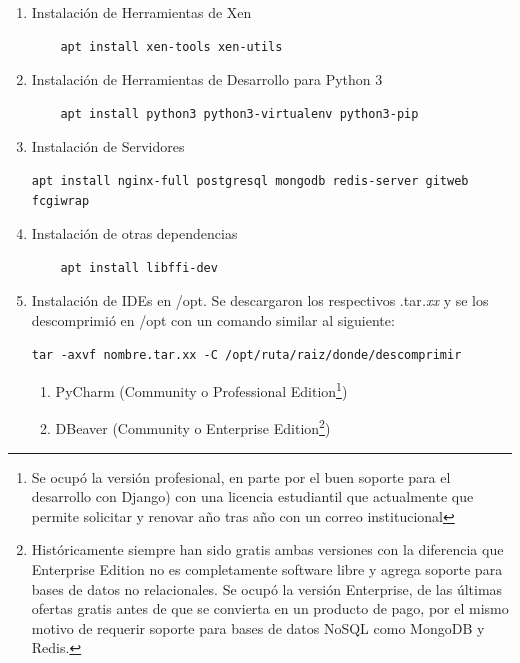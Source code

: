 \begin{enumerate}
\begin{lstlisting}[breaklines=true]
	auto xenbr0
	iface xenbr0 inet static
		address 10.10.10.1
		netmask 255.255.255.0
		bridge_ports wlan0

	#other possibly useful options in a
	#	virtualized environment
		#bridge_stp off		# disable
		#		Spanning Tree Protocol
		#bridge_waitport 0	# no delay
		#		before a port becomes
		#		available
		#bridge_fd 0		# no forwarding
		#		delay

	## configure a (separate) bridge for
	#	the DomUs without giving Dom0 an
	#	IP on it
	#auto xenbr1
	#iface xenbr1 inet manual
	#   bridge_ports eth1

	EOF

	reboot
		\end{lstlisting}
	\item Instalación de Herramientas de Xen
		\begin{lstlisting}
	apt install xen-tools xen-utils
		\end{lstlisting}
    \item Instalación de Herramientas de Desarrollo para Python 3
    	\begin{lstlisting}
	apt install python3 python3-virtualenv python3-pip
    	\end{lstlisting}
    \item Instalación de Servidores
    	\begin{lstlisting}[breaklines=true]
	apt install nginx-full postgresql mongodb redis-server gitweb fcgiwrap
    	\end{lstlisting}
    \item Instalación de otras dependencias
    	\begin{lstlisting}
	apt install libffi-dev
    	\end{lstlisting}
    \item Instalación de IDEs en /opt. Se descargaron los respectivos .tar\textit{.xx} y se los descomprimió en /opt con un comando similar al siguiente:
    	\begin{lstlisting}[breaklines=true]
	tar -axvf nombre.tar.xx -C /opt/ruta/raiz/donde/descomprimir
    	\end{lstlisting}
    \begin{enumerate}
    	\item PyCharm (Community o Professional Edition\footnote{Se ocupó la versión profesional, en parte por el buen soporte para el desarrollo con Django) con una licencia estudiantil que actualmente que permite solicitar y renovar año tras año con un correo institucional})
        \item DBeaver (Community o Enterprise Edition\footnote{Históricamente siempre han sido gratis ambas versiones con la diferencia que Enterprise Edition no es completamente software libre y agrega soporte para bases de datos no relacionales. Se ocupó la versión Enterprise, de las últimas ofertas gratis antes de que se convierta en un producto de pago, por el mismo motivo de requerir soporte para bases de datos NoSQL como MongoDB y Redis.})
    \end{enumerate}
\end{enumerate}


